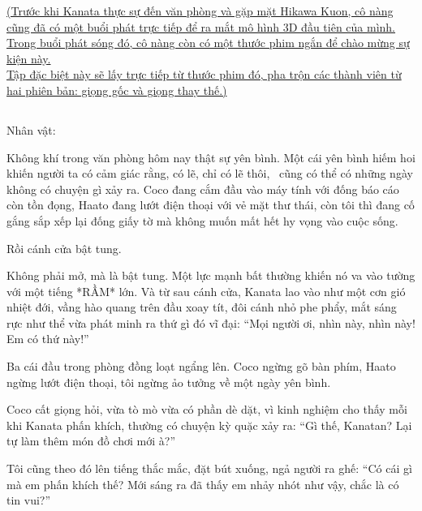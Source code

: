 \documentclass[../main.tex]{subfiles}
\begin{document}
\begin{center}
  \uline{(Trước khi Kanata thực sự đến văn phòng và gặp mặt Hikawa Kuon, cô nàng cũng đã có một buổi phát trực tiếp để ra mắt mô hình 3D đầu tiên của mình. Trong buổi phát sóng đó, cô nàng còn có một thước phim ngắn để chào mừng sự kiện này.\\Tập đặc biệt này sẽ lấy trực tiếp từ thước phim đó, pha trộn các thành viên từ hai phiên bản: giọng gốc và giọng thay thế.)}
\end{center}


\newpage

\subsection*{\label{ep-S7.I}}
\begin{center}
  {\caviar\fontsize{12pt}{12pt}\selectfont Nhân vật:    }
\end{center}

Không khí trong văn phòng hôm nay thật sự yên bình. Một cái yên bình hiếm hoi khiến người ta có cảm giác rằng, có lẽ, chỉ có lẽ thôi, \hll\ cũng có thể có những ngày không có chuyện gì xảy ra. Coco đang cắm đầu vào máy tính với đống báo cáo còn tồn đọng, Haato đang lướt điện thoại với vẻ mặt thư thái, còn tôi thì đang cố gắng sắp xếp lại đống giấy tờ mà không muốn mất hết hy vọng vào cuộc sống.

Rồi cánh cửa bật tung.

Không phải mở, mà là bật tung. Một lực mạnh bất thường khiến nó va vào tường với một tiếng *RẦM* lớn. Và từ sau cánh cửa, Kanata lao vào như một cơn gió nhiệt đới, vầng hào quang trên đầu xoay tít, đôi cánh nhỏ phe phẩy, mắt sáng rực như thể vừa phát minh ra thứ gì đó vĩ đại: ``Mọi người ơi, nhìn này, nhìn này! Em có thứ này!''

Ba cái đầu trong phòng đồng loạt ngẩng lên. Coco ngừng gõ bàn phím, Haato ngừng lướt điện thoại, tôi ngừng ảo tưởng về một ngày yên bình.

Coco cất giọng hỏi, vừa tò mò vừa có phần dè dặt, vì kinh nghiệm cho thấy mỗi khi Kanata phấn khích, thường có chuyện kỳ quặc xảy ra: ``Gì thế, Kanatan? Lại tự làm thêm món đồ chơi mới à?''

Tôi cũng theo đó lên tiếng thắc mắc, đặt bút xuống, ngả người ra ghế: ``Có cái gì mà em phấn khích thế? Mới sáng ra đã thấy em nhảy nhót như vậy, chắc là có tin vui?''
\end{document}
